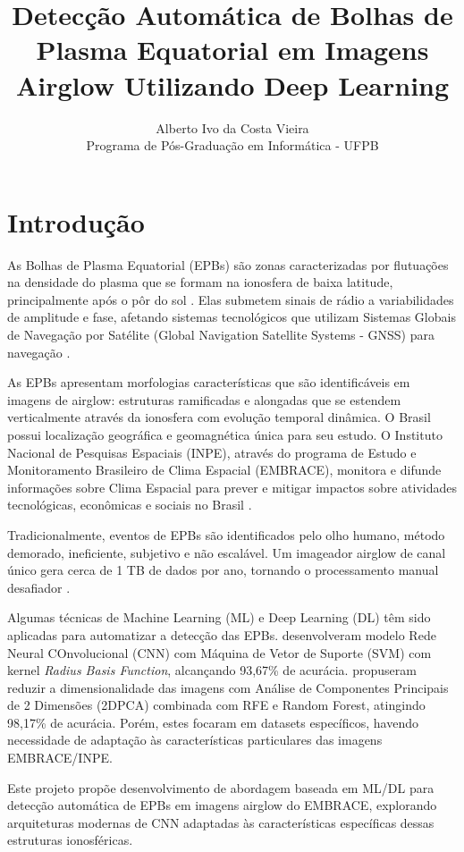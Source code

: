 \documentclass[twocolumn]{article}
\title{\textbf{Detecção Automática de Bolhas de Plasma Equatorial em Imagens Airglow Utilizando Deep Learning}}
\author{Alberto Ivo da Costa Vieira\\
\small Programa de Pós-Graduação em Informática - UFPB}
\begin{document}
\maketitle

\section{Introdução}

As Bolhas de Plasma Equatorial (EPBs) são zonas caracterizadas por flutuações na densidade do plasma que se formam na ionosfera de baixa latitude, principalmente após o pôr do sol \cite{Githio2024}. Elas submetem sinais de rádio a variabilidades de amplitude e fase, afetando sistemas tecnológicos que utilizam Sistemas Globais de Navegação por Satélite (Global Navigation Satellite Systems - GNSS) para navegação \cite{Githio2024}.

As EPBs apresentam morfologias características que são identificáveis em imagens de airglow: estruturas ramificadas e alongadas que se estendem verticalmente através da ionosfera com evolução temporal dinâmica. O Brasil possui localização geográfica e geomagnética única para seu estudo. O Instituto Nacional de Pesquisas Espaciais (INPE), através do programa de Estudo e Monitoramento Brasileiro de Clima Espacial (EMBRACE), monitora e difunde informações sobre Clima Espacial para prever e mitigar impactos sobre atividades tecnológicas, econômicas e sociais no Brasil \cite{EMBRACE2021}.

Tradicionalmente, eventos de EPBs são identificados pelo olho humano, método demorado, ineficiente, subjetivo e não escalável. Um imageador airglow de canal único gera cerca de 1 TB de dados por ano, tornando o processamento manual desafiador \cite{Zhong2025}.

Algumas técnicas de Machine Learning (ML) e Deep Learning (DL) têm sido aplicadas para automatizar a detecção das EPBs. \cite{Thanakulketsarat2023} desenvolveram modelo Rede Neural COnvolucional (CNN) com Máquina de Vetor de Suporte (SVM) com kernel \textit{Radius Basis Function}, alcançando 93,67\% de acurácia. \cite{Yacoub2025} propuseram reduzir a dimensionalidade das imagens com Análise de Componentes Principais de 2 Dimensões (2DPCA) combinada com RFE e Random Forest, atingindo 98,17\% de acurácia. Porém, estes focaram em datasets específicos, havendo necessidade de adaptação às características particulares das imagens EMBRACE/INPE.

Este projeto propõe desenvolvimento de abordagem baseada em ML/DL para detecção automática de EPBs em imagens airglow do EMBRACE, explorando arquiteturas modernas de CNN adaptadas às características específicas dessas estruturas ionosféricas.
\end{document}
